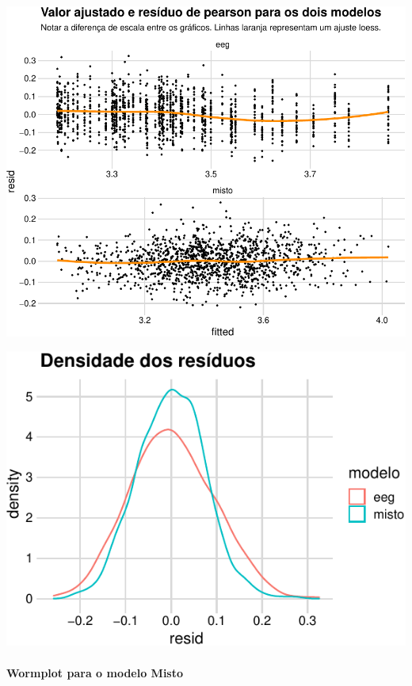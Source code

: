 \documentclass[
  11pt,
]{article}
\begin{document}
\begin{center}\includegraphics{lista3_files/figure-latex/unnamed-chunk-32-1} \end{center}

\begin{center}\includegraphics{lista3_files/figure-latex/unnamed-chunk-33-1} \end{center}

\hypertarget{wormplot-para-o-modelo-misto}{%
\paragraph{Wormplot para o modelo Misto}\label{wormplot-para-o-modelo-misto}}
\end{document}
